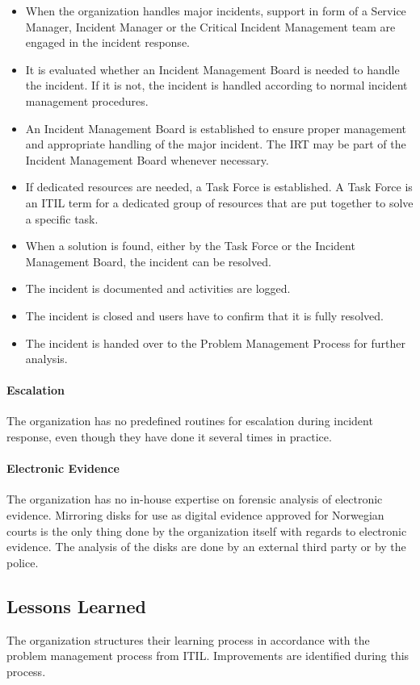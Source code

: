 \begin{itemize}
\item When the organization handles major incidents, support in form of a Service Manager, Incident Manager or the Critical Incident Management team are engaged in the incident response.
\item It is evaluated whether an Incident Management Board is needed to handle the incident. If it is not, the incident is handled according to normal incident management procedures.
\item An Incident Management Board is established to ensure proper management and appropriate handling of the major incident. The \ac{IRT} may be part of the Incident Management Board whenever necessary.
\item If dedicated resources are needed, a Task Force is established. A Task Force is an ITIL term for a dedicated group of resources that are put together to solve a specific task.
\item When a solution is found, either by the Task Force or the Incident Management Board, the incident can be resolved.
\item The incident is documented and activities are logged.
\item The incident is closed and users have to confirm that it is fully resolved.
\item The incident is handed over to the Problem Management Process for further analysis.  
\end{itemize}


\paragraph{Escalation}
The organization has no predefined routines for escalation during incident response, even though they have done it several times in practice.

\paragraph{Electronic Evidence}
The organization has no in-house expertise on forensic analysis of electronic evidence. Mirroring disks for use as digital evidence approved for Norwegian courts is the only thing done by the organization itself with regards to electronic evidence. The analysis of the disks are done by an external third party or by the police.

\subsection{Lessons Learned}
The organization structures their learning process in accordance with the problem management process from ITIL. Improvements are identified during this process. 

